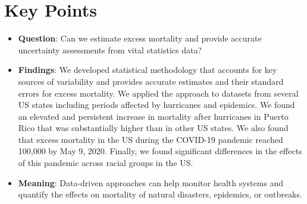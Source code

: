 \documentclass[11pt]{article}
\begin{document}
\section*{Key Points}
\begin{itemize}
    \item \textbf{Question}: Can we estimate excess mortality and provide accurate uncertainty assessments from vital statistics data?
    \item \textbf{Findings}: We developed statistical methodology that accounts for key sources of variability and provides accurate estimates and their standard errors for excess mortality. We applied the approach to datasets from several US states including periods affected by hurricanes and epidemics. We found an elevated and persistent increase in mortality after hurricanes in Puerto Rico that was substantially higher than in other US states. We also found that excess mortality in the US during the COVID-19 pandemic reached 100,000 by May 9, 2020. Finally, we found significant differences in the effects of this pandemic across racial groups in the US.
    \item \textbf{Meaning}: Data-driven approaches can help monitor health systems and quantify the effects on mortality of natural disasters, epidemics, or outbreaks.
\end{itemize}

\newpage
\end{document}
